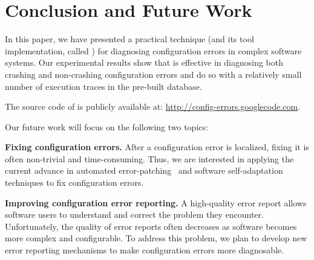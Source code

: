 \section{Conclusion and Future Work}

In this paper, we have presented a practical technique (and
its tool implementation, called \ourtool) for diagnosing
configuration errors in complex software systems.
Our experimental results show that \ourtool is effective in
diagnosing both crashing and non-crashing configuration errors
and do so with a relatively small number of execution
traces in the pre-built database.

The source code of \ourtool is publicly available at:
\url{http://config-errors.googlecode.com}.

\vspace{1mm}

Our future
work will focus on the following two topics:

\textbf{Fixing configuration errors.} After a configuration error
is localized, fixing it is
often non-trivial and time-consuming. Thus, we
are interested in applying the current advance in
automated error-patching~\cite{rangefix} and
software self-adaptation~\cite{Wang:2009:STR, Mori:2011:LSU} techniques to
fix configuration errors.


\textbf{Improving configuration error reporting.} A high-quality
error report allows software users to understand and correct the problem
they encounter. 
Unfortunately, the quality of error reports often
decreases as software becomes more complex and configurable.
To address this problem, we plan to develop new error reporting mechanisms
to make configuration errors
more diagnosable.

